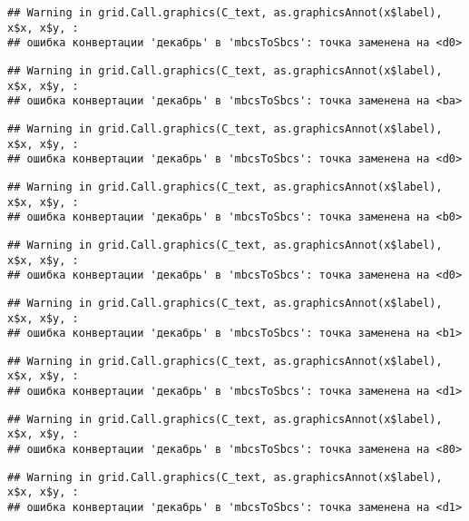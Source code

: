 \documentclass[
]{article}
\begin{document}
\begin{verbatim}
## Warning in grid.Call.graphics(C_text, as.graphicsAnnot(x$label), x$x, x$y, :
## ошибка конвертации 'декабрь' в 'mbcsToSbcs': точка заменена на <d0>
\end{verbatim}

\begin{verbatim}
## Warning in grid.Call.graphics(C_text, as.graphicsAnnot(x$label), x$x, x$y, :
## ошибка конвертации 'декабрь' в 'mbcsToSbcs': точка заменена на <ba>
\end{verbatim}

\begin{verbatim}
## Warning in grid.Call.graphics(C_text, as.graphicsAnnot(x$label), x$x, x$y, :
## ошибка конвертации 'декабрь' в 'mbcsToSbcs': точка заменена на <d0>
\end{verbatim}

\begin{verbatim}
## Warning in grid.Call.graphics(C_text, as.graphicsAnnot(x$label), x$x, x$y, :
## ошибка конвертации 'декабрь' в 'mbcsToSbcs': точка заменена на <b0>
\end{verbatim}

\begin{verbatim}
## Warning in grid.Call.graphics(C_text, as.graphicsAnnot(x$label), x$x, x$y, :
## ошибка конвертации 'декабрь' в 'mbcsToSbcs': точка заменена на <d0>
\end{verbatim}

\begin{verbatim}
## Warning in grid.Call.graphics(C_text, as.graphicsAnnot(x$label), x$x, x$y, :
## ошибка конвертации 'декабрь' в 'mbcsToSbcs': точка заменена на <b1>
\end{verbatim}

\begin{verbatim}
## Warning in grid.Call.graphics(C_text, as.graphicsAnnot(x$label), x$x, x$y, :
## ошибка конвертации 'декабрь' в 'mbcsToSbcs': точка заменена на <d1>
\end{verbatim}

\begin{verbatim}
## Warning in grid.Call.graphics(C_text, as.graphicsAnnot(x$label), x$x, x$y, :
## ошибка конвертации 'декабрь' в 'mbcsToSbcs': точка заменена на <80>
\end{verbatim}

\begin{verbatim}
## Warning in grid.Call.graphics(C_text, as.graphicsAnnot(x$label), x$x, x$y, :
## ошибка конвертации 'декабрь' в 'mbcsToSbcs': точка заменена на <d1>
\end{verbatim}
\end{document}
